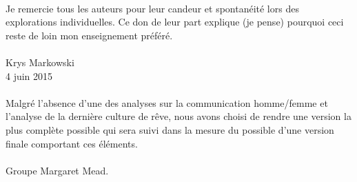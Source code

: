 \documentclass[12pt,twoside]{book}
\begin{document}
\paragraph{} Je remercie tous les auteurs pour leur candeur et spontanéité lors
des explorations individuelles. Ce don de leur part explique (je pense)
pourquoi ceci reste de loin mon enseignement préféré.

\paragraph{} Krys Markowski\\4 juin 2015

\paragraph{} Malgré l'absence d'une des analyses sur la communication homme/femme et l'analyse de la dernière culture de rêve, nous avons choisi de rendre une version la plus complète possible qui sera suivi dans la mesure du possible d'une version finale comportant ces éléments. 
\paragraph{} Groupe Margaret Mead.

\thispagestyle{plain}



\thispagestyle{plain}

\tableofcontents

\mainmatter





\appendix


\end{document}
